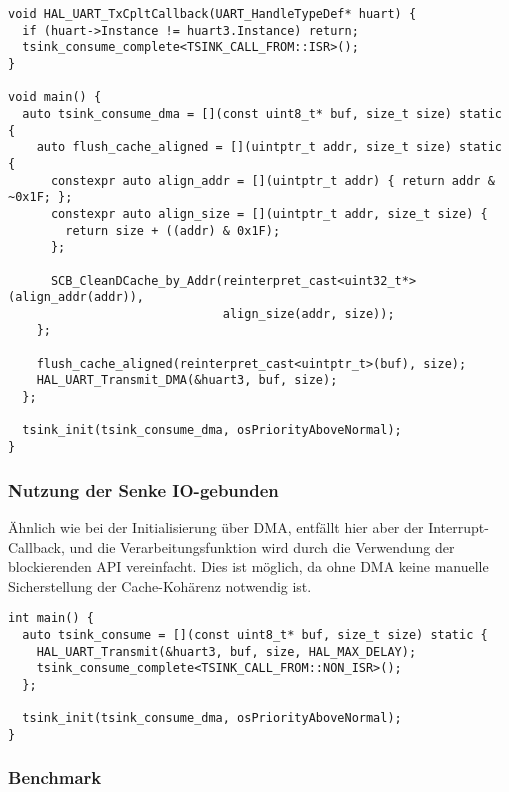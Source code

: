 \begin{code}
\begin{verbatim}
void HAL_UART_TxCpltCallback(UART_HandleTypeDef* huart) {
  if (huart->Instance != huart3.Instance) return;
  tsink_consume_complete<TSINK_CALL_FROM::ISR>();
}

void main() {
  auto tsink_consume_dma = [](const uint8_t* buf, size_t size) static {
    auto flush_cache_aligned = [](uintptr_t addr, size_t size) static {
      constexpr auto align_addr = [](uintptr_t addr) { return addr & ~0x1F; };
      constexpr auto align_size = [](uintptr_t addr, size_t size) {
        return size + ((addr) & 0x1F);
      };

      SCB_CleanDCache_by_Addr(reinterpret_cast<uint32_t*>(align_addr(addr)),
                              align_size(addr, size));
    };

    flush_cache_aligned(reinterpret_cast<uintptr_t>(buf), size);
    HAL_UART_Transmit_DMA(&huart3, buf, size);
  };

  tsink_init(tsink_consume_dma, osPriorityAboveNormal);
}
\end{verbatim}
\end{code}

\subsubsection{Nutzung der Senke IO-gebunden}

Ähnlich wie bei der Initialisierung über DMA, entfällt hier aber der
Interrupt-Callback, und die Verarbeitungsfunktion wird durch die Verwendung der
blockierenden API vereinfacht. Dies ist möglich, da ohne DMA keine manuelle
Sicherstellung der Cache-Kohärenz notwendig ist.

\begin{code}
\begin{verbatim}
int main() {
  auto tsink_consume = [](const uint8_t* buf, size_t size) static {
    HAL_UART_Transmit(&huart3, buf, size, HAL_MAX_DELAY);
    tsink_consume_complete<TSINK_CALL_FROM::NON_ISR>();
  };

  tsink_init(tsink_consume_dma, osPriorityAboveNormal);
}
\end{verbatim}
\end{code}

\subsubsection{Benchmark}


